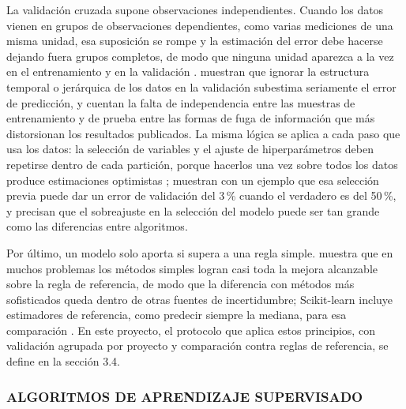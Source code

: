 La validación cruzada supone observaciones independientes. Cuando los datos vienen en grupos de observaciones dependientes, como varias mediciones de una misma unidad, esa suposición se rompe y la estimación del error debe hacerse dejando fuera grupos completos, de modo que ninguna unidad aparezca a la vez en el entrenamiento y en la validación \parencite{SklearnCrossValidation, SklearnGroupKFold}. \textcite{Roberts2017} muestran que ignorar la estructura temporal o jerárquica de los datos en la validación subestima seriamente el error de predicción, y \textcite{Kapoor2023} cuentan la falta de independencia entre las muestras de entrenamiento y de prueba entre las formas de fuga de información que más distorsionan los resultados publicados. La misma lógica se aplica a cada paso que usa los datos: la selección de variables y el ajuste de hiperparámetros deben repetirse dentro de cada partición, porque hacerlos una vez sobre todos los datos produce estimaciones optimistas \parencite{Ambroise2002, VarmaSimon2006}; \textcite{Hastie2009} muestran con un ejemplo que esa selección previa puede dar un error de validación del 3\,\% cuando el verdadero es del 50\,\%, y \textcite{CawleyTalbot2010} precisan que el sobreajuste en la selección del modelo puede ser tan grande como las diferencias entre algoritmos.

Por último, un modelo solo aporta si supera a una regla simple. \textcite{Hand2006} muestra que en muchos problemas los métodos simples logran casi toda la mejora alcanzable sobre la regla de referencia, de modo que la diferencia con métodos más sofisticados queda dentro de otras fuentes de incertidumbre; Scikit-learn incluye estimadores de referencia, como predecir siempre la mediana, para esa comparación \parencite{SklearnDummy}. En este proyecto, el protocolo que aplica estos principios, con validación agrupada por proyecto y comparación contra reglas de referencia, se define en la sección 3.4.

\subsubsection{ALGORITMOS DE APRENDIZAJE SUPERVISADO}

